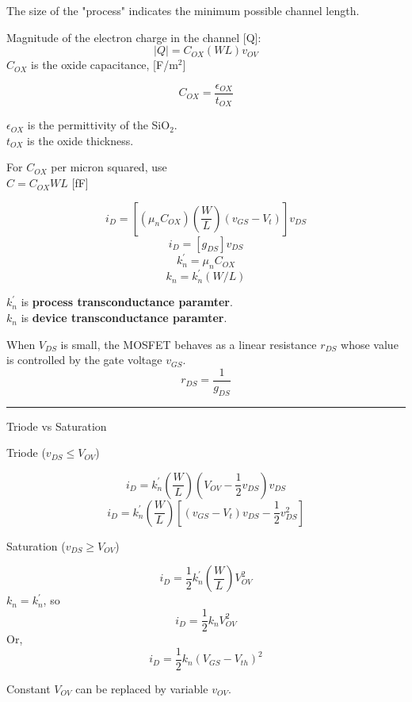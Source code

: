 \documentclass[a4paper]{article}
\begin{document}
\begin{multicols}{3}
\raggedright
\fontsize{9pt}{0.3pt}\selectfont
\setlength{\abovedisplayskip}{2pt}
\setlength{\belowdisplayskip}{0pt}

The size of the "process" indicates the minimum
possible channel length. 

Magnitude of the electron charge in the channel [Q]:$$|Q|=C_{OX}(WL)v_{OV}$$
$C_{OX}$ is the oxide capacitance, [F/m$^2$]

$$C_{OX}=\frac{\epsilon_{OX}}{t_{OX}}$$

$\epsilon_{OX}$ is the permittivity of the SiO$_2$.\\
$t_{OX}$ is the oxide thickness.

For $C_{OX}$ per micron squared, use \\
$C=C_{OX}WL$ [fF]

$$i_D=\left[ (\mu_nC_{OX})\left(\frac{W}{L}\right)(v_{GS}-V_t)\right]v_{DS}$$
$$i_D=\left[ g_{DS} \right]v_{DS}$$
$$k_n^{'}=\mu_nC_{OX}$$
$$k_n=k_n^{'}(W/L)$$

$k_n^{'}$ is \textbf{process transconductance paramter}.\\
$k_n$ is \textbf{device transconductance paramter}.
\vspace{1mm}

When $V_{DS}$ is small, the MOSFET behaves as a linear 
resistance $r_{DS}$ whose value is controlled by the gate 
voltage $v_{GS}$.
$$r_{DS}=\frac{1}{g_{DS}}$$


\hrule
\vspace{1mm}
Triode vs Saturation


Triode ($v_{DS} \leq V_{OV}$)

$$i_D=k_n^{'}\left(\frac{W}{L}\right)\left(V_{OV}-\frac{1}{2}v_{DS}\right)v_{DS}$$
$$i_D=k_n^{'}\left(\frac{W}{L}\right)\left[(v_{GS}-V_t)v_{DS}-\frac{1}{2}v_{DS}^2\right]$$

Saturation ($v_{DS} \geq V_{OV}$)

$$i_D=\frac{1}{2}k_n^{'}\left(\frac{W}{L}\right)V_{OV}^2$$
$k_n=k_n^{'}$, so
$$i_D=\frac{1}{2}k_nV_{OV}^2$$
Or,
$$i_D=\frac{1}{2}k_n(V_{GS}-V_{th})^2$$


Constant $V_{OV}$ can be replaced by variable $v_{OV}$.


\end{multicols}
\end{document}
